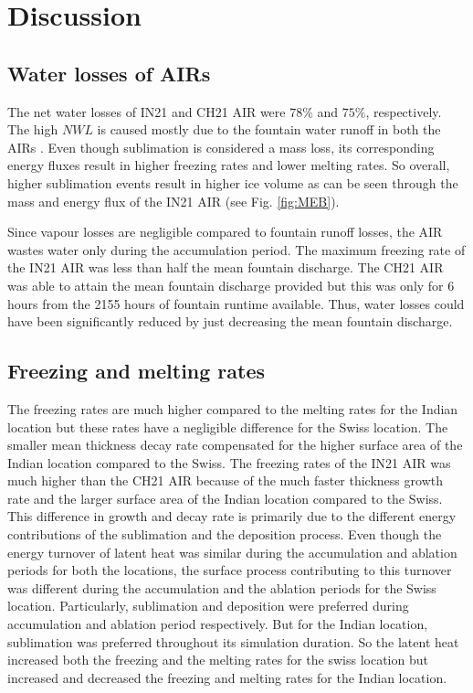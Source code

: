\documentclass[utf8]{frontiersSCNS}
\begin{document}
\section{Discussion}

\subsection{Water losses of AIRs}

The net water losses of IN21 and CH21 AIR were $78\%$ and $75\%$, respectively. The high $NWL$ is caused mostly
due to the fountain water runoff in both the AIRs . Even though sublimation is considered a mass loss, its
corresponding energy fluxes result in higher freezing rates and lower melting rates. So overall, higher
sublimation events result in higher ice volume as can be seen through the mass and energy flux of the IN21 AIR
(see Fig.  \ref{fig:MEB}).

Since vapour losses are negligible compared to fountain runoff losses, the AIR wastes water only during the
accumulation period. The maximum freezing rate of the IN21 AIR was less than half the mean fountain discharge. The
CH21 AIR was able to attain the mean fountain discharge provided but this was only for 6 hours from the 2155
hours of fountain runtime available. Thus, water losses could have been significantly reduced by just decreasing
the mean fountain discharge.

\subsection{Freezing and melting rates}

The freezing rates are much higher compared to the melting rates for the Indian location but these rates have a
negligible difference for the Swiss location. The smaller mean thickness decay rate compensated for the higher
surface area of the Indian location compared to the Swiss. The freezing rates of the IN21 AIR was much higher
than the CH21 AIR because of the much faster thickness growth rate and the larger surface area of the Indian
location compared to the Swiss. This difference in growth and decay rate is primarily due to the different
energy contributions of the sublimation and the deposition process. Even though the energy turnover of latent
heat was similar during the accumulation and ablation periods for both the locations, the surface process
contributing to this turnover was different during the accumulation and the ablation periods for the Swiss
location. Particularly, sublimation and deposition were preferred during accumulation and ablation period
respectively. But for the Indian location, sublimation was preferred throughout its simulation duration. So the
latent heat increased both the freezing and the melting rates for the swiss location but increased and decreased
the freezing and melting rates for the Indian location.
\end{document}

